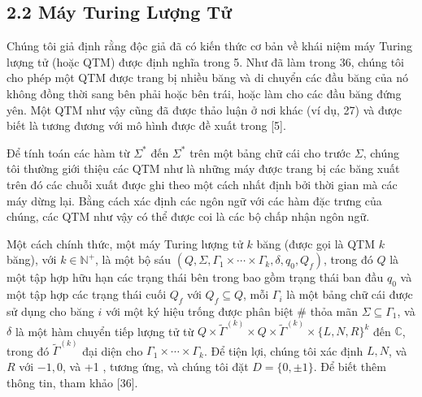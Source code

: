 \documentclass[10pt]{article}
\begin{document}
\subsection*{2.2 Máy Turing Lượng Tử}
Chúng tôi giả định rằng độc giả đã có kiến thức cơ bản về khái niệm máy Turing lượng tử (hoặc QTM) được định nghĩa trong 5. Như đã làm trong 36, chúng tôi cho phép một QTM được trang bị nhiều băng và di chuyển các đầu băng của nó không đồng thời sang bên phải hoặc bên trái, hoặc làm cho các đầu băng đứng yên. Một QTM như vậy cũng đã được thảo luận ở nơi khác (ví dụ, 27) và được biết là tương đương với mô hình được đề xuất trong [5].

Để tính toán các hàm từ $\Sigma^{*}$ đến $\Sigma^{*}$ trên một bảng chữ cái cho trước $\Sigma$, chúng tôi thường giới thiệu các QTM như là những máy được trang bị các băng xuất trên đó các chuỗi xuất được ghi theo một cách nhất định bởi thời gian mà các máy dừng lại. Bằng cách xác định các ngôn ngữ với các hàm đặc trưng của chúng, các QTM như vậy có thể được coi là các bộ chấp nhận ngôn ngữ.

Một cách chính thức, một máy Turing lượng tử $k$ băng (được gọi là QTM $k$ băng), với $k \in \mathbb{N}^{+}$, là một bộ sáu $\left(Q, \Sigma, \Gamma_{1} \times \cdots \times \Gamma_{k}, \delta, q_{0}, Q_{f}\right)$, trong đó $Q$ là một tập hợp hữu hạn các trạng thái bên trong bao gồm trạng thái ban đầu $q_{0}$ và một tập hợp các trạng thái cuối $Q_{f}$ với $Q_{f} \subseteq Q$, mỗi $\Gamma_{i}$ là một bảng chữ cái được sử dụng cho băng $i$ với một ký hiệu trống được phân biệt \# thỏa mãn $\Sigma \subseteq \Gamma_{1}$, và $\delta$ là một hàm chuyển tiếp lượng tử từ $Q \times \tilde{\Gamma}^{(k)} \times Q \times \tilde{\Gamma}^{(k)} \times\{L, N, R\}^{k}$ đến $\mathbb{C}$, trong đó $\tilde{\Gamma}^{(k)}$ đại diện cho $\Gamma_{1} \times \cdots \times \Gamma_{k}$. Để tiện lợi, chúng tôi xác định $L, N$, và $R$ với $-1,0$, và +1 , tương ứng, và chúng tôi đặt $D=\{0, \pm 1\}$. Để biết thêm thông tin, tham khảo [36].
\end{document}
